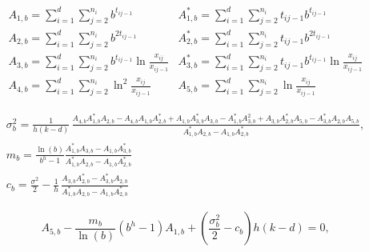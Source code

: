 \documentclass{sig-alternate}
\begin{document}
\begin{figure*}[htb]
\begin{eqnarray}
    A_{1,b}=\displaystyle\sum_{i=1}^{d}\displaystyle\sum_{j=2}^{n_i}b^{t_{ij-1}}&
    A^*_{1,b}=\displaystyle\sum_{i=1}^{d}\displaystyle\sum_{j=2}^{n_i}t_{ij-1}b^{t_{ij-1}} \label{tochoEcuacion}
\\
    A_{2,b}=\displaystyle\sum_{i=1}^{d}\displaystyle\sum_{j=2}^{n_i}b^{2t_{ij-1}}&
    A^*_{2,b}=\displaystyle\sum_{i=1}^{d}\displaystyle\sum_{j=2}^{n_i}t_{ij-1}b^{2t_{ij-1}}\nonumber\\
    A_{3,b}=\displaystyle\sum_{i=1}^{d}\displaystyle\sum_{j=2}^{n_i}b^{t_{ij-1}}
    \ln\displaystyle\frac{x_{ij}}{x_{ij-1}} &
    A^*_{3,b}=\displaystyle\sum_{i=1}^{d}\displaystyle\sum_{j=2}^{n_i}t_{ij-1}b^{t_{ij-1}}
  \ln\displaystyle\frac{x_{ij}}{x_{ij-1}}\nonumber\\
  A_{4,b}=\displaystyle\sum_{i=1}^{d}\displaystyle\sum_{j=2}^{n_i}\ln^2\displaystyle\frac{x_{ij}}{x_{ij-1}} & A_{5,b}=\displaystyle\sum_{i=1}^{d}\displaystyle\sum_{j=2}^{n_i}\ln\displaystyle\frac{x_{ij}}{x_{ij-1}}\nonumber
\end{eqnarray}
\end{figure*}



\begin{figure*}[htb]
\begin{eqnarray}
\sigma_b^2=\frac{1}{h(k-d)}\,\frac{A_{4,b}A^*_{1,b}A_{2,b}-A_{4,b}A_{1,b}A^*_{2,b}+A_{1,b}A^*_{3,b}A_{3,b}-A^*_{1,b}A^2_{3,b}+
    A_{3,b}A^*_{2,b}A_{5,b}-A^*_{3,b}A_{2,b}A_{5,b}}{A^*_{1,b}A_{2,b}-A_{1,b}A^*_{2,b}},\label{estima}\\
    m_b= \frac{\ln(b)}{b^h-1}\frac{A^*_{1,b}A_{3,b}- A_{1,b}A^*_{3,b}}{A^*_{1,b}A_{2,b}-A_{1,b}A^*_{2,b}}\nonumber\\
    c_b=\frac{\sigma^2}{2}-\frac{1}{h}\,\frac{A_{3,b}A^*_{2,b}-A^*_{3,b}A_{2,b}}{A^*_{1,b}A_{2,b}-A_{1,b}A^*_{2,b}}\nonumber
\end{eqnarray}
\end{figure*}


\begin{equation}\label{ecuacion}
    A_{5,b}-\frac{m_b}{\ln(b)}(b^h-1)A_{1,b}+\left(\frac{\sigma_b^2}{2}-c_b\right)h(k-d)=0 ,
\end{equation}
\end{document}

